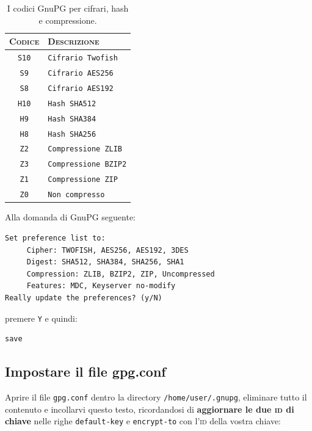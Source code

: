 \documentclass[a4paper,10pt]{article}
\begin{document}
\begin{table}[ht!]
	\begin{tabular}{cl}
 		\hline
		\textsc{Codice} & \textsc{Descrizione} \\
		\hline
		\texttt{S10} & \texttt{Cifrario Twofish} \\
		\texttt{S9} & \texttt{Cifrario AES256} \\
		\texttt{S8} & \texttt{Cifrario AES192} \\
		\texttt{H10} & \texttt{Hash SHA512} \\
		\texttt{H9} & \texttt{Hash SHA384} \\
		\texttt{H8} & \texttt{Hash SHA256} \\
		\texttt{Z2} & \texttt{Compressione ZLIB} \\
		\texttt{Z3} & \texttt{Compressione BZIP2} \\
		\texttt{Z1} & \texttt{Compressione ZIP} \\
		\texttt{Z0} & \texttt{Non compresso} \\
		\hline
	\end{tabular}
	\caption{I codici GnuPG per cifrari, hash e compressione.}
	\label{table:codici}
\end{table}

Alla domanda di GnuPG seguente:

\begin{lstlisting}
Set preference list to:
     Cipher: TWOFISH, AES256, AES192, 3DES
     Digest: SHA512, SHA384, SHA256, SHA1
     Compression: ZLIB, BZIP2, ZIP, Uncompressed
     Features: MDC, Keyserver no-modify
Really update the preferences? (y/N)
\end{lstlisting}

premere \texttt{Y} e quindi:

\begin{lstlisting}
save
\end{lstlisting}

\subsection{Impostare il file gpg.conf}

Aprire il file \texttt{gpg.conf} dentro la directory \texttt{/home/user/.gnupg}, eliminare tutto il contenuto e incollarvi questo testo, ricordandosi di \textbf{aggiornare le due \textsc{id} di chiave} nelle righe \texttt{default-key} e \texttt{encrypt-to} con l'\textsc{id} della vostra chiave:
\end{document}
